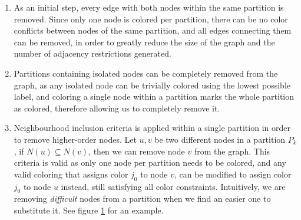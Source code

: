\begin{enumerate}
	\item{As an initial step, every edge with both nodes within the same partition is removed. Since only one node is colored per partition, there can be no color conflicts between nodes of the same partition, and all edges connecting them can be removed, in order to greatly reduce the size of the graph and the number of adjacency restrictions generated.}
	\item{Partitions containing isolated nodes can be completely removed from the graph, as any isolated node can be trivially colored using the lowest possible label, and coloring a single node within a partition marks the whole partition as colored, therefore allowing us to completely remove it.}
	\item{Neighbourhood inclusion criteria is applied within a single partition in order to remove higher-order nodes. Let $u,v$ be two different nodes in a partition $P_k$, if $N(u) \subseteq N(v)$, then we can remove node $v$ from the graph. This criteria is valid as only one node per partition needs to be colored, and any valid coloring that assigns color $j_0$ to node $v$, can be modified to assign color $j_0$ to node $u$ instead, still satisfying all color constraints. Intuitively, we are removing \textit{difficult} nodes from a partition when we find an easier one to substitute it. See figure \ref{fig:neighbourinclusion} for an example.}
	
\begin{figure}[h]
	\label{fig:neighbourinclusion}
	\centering
\end{figure}
\end{enumerate}
